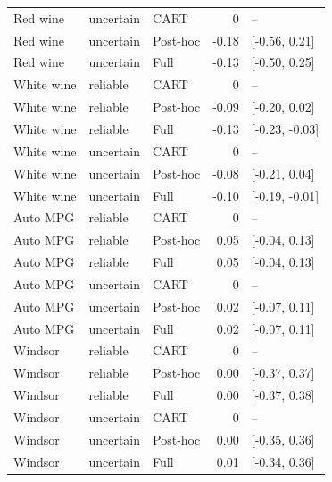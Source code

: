 \begin{tabular}{lllrl}
Red wine & uncertain & CART & 0 & -- \\
Red wine & uncertain & Post-hoc & -0.18 & [-0.56, 0.21] \\
Red wine & uncertain & Full & -0.13 & [-0.50, 0.25] \\
White wine & reliable & CART & 0 & -- \\
White wine & reliable & Post-hoc & -0.09 & [-0.20, 0.02] \\
White wine & reliable & Full & -0.13 & [-0.23, -0.03] \\
White wine & uncertain & CART & 0 & -- \\
White wine & uncertain & Post-hoc & -0.08 & [-0.21, 0.04] \\
White wine & uncertain & Full & -0.10 & [-0.19, -0.01] \\
Auto MPG & reliable & CART & 0 & -- \\
Auto MPG & reliable & Post-hoc & 0.05 & [-0.04, 0.13] \\
Auto MPG & reliable & Full & 0.05 & [-0.04, 0.13] \\
Auto MPG & uncertain & CART & 0 & -- \\
Auto MPG & uncertain & Post-hoc & 0.02 & [-0.07, 0.11] \\
Auto MPG & uncertain & Full & 0.02 & [-0.07, 0.11] \\
Windsor & reliable & CART & 0 & -- \\
Windsor & reliable & Post-hoc & 0.00 & [-0.37, 0.37] \\
Windsor & reliable & Full & 0.00 & [-0.37, 0.38] \\
Windsor & uncertain & CART & 0 & -- \\
Windsor & uncertain & Post-hoc & 0.00 & [-0.35, 0.36] \\
Windsor & uncertain & Full & 0.01 & [-0.34, 0.36] \\
\bottomrule
\end{tabular}
